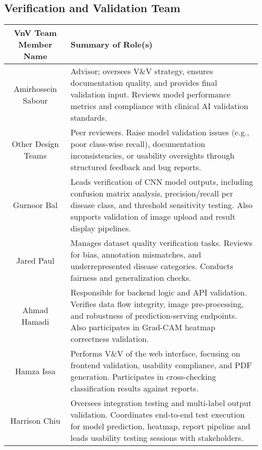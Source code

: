 \documentclass[12pt, titlepage]{article}
\begin{document}
\subsection{Verification and Validation Team}


\begin{table}[h]
  \centering
  \begin{tabular}{|c|p{}|}
    \hline
    \textbf{VnV Team Member Name} & \textbf{Summary of Role(s)} \\ \hline

    Amirhossein Sabour & 
    Advisor; oversees V\&V strategy, ensures documentation quality, and provides final validation input. Reviews model performance metrics and compliance with clinical AI validation standards. \\ \hline

    Other Design Teams & 
    Peer reviewers. Raise model validation issues (e.g., poor class-wise recall), documentation inconsistencies, or usability oversights through structured feedback and bug reports. \\ \hline

    Gurnoor Bal & 
    Leads verification of CNN model outputs, including confusion matrix analysis, precision/recall per disease class, and threshold sensitivity testing. Also supports validation of image upload and result display pipelines. \\ \hline

    Jared Paul & 
    Manages dataset quality verification tasks. Reviews for bias, annotation mismatches, and underrepresented disease categories. Conducts fairness and generalization checks. \\ \hline

    Ahmad Hamadi & 
    Responsible for backend logic and API validation. Verifies data flow integrity, image pre-processing, and robustness of prediction-serving endpoints. Also participates in Grad-CAM heatmap correctness validation. \\ \hline

    Hamza Issa & 
    Performs V\&V of the web interface, focusing on frontend validation, usability compliance, and PDF generation. Participates in cross-checking classification results against reports. \\ \hline

    Harrison Chiu & 
    Oversees integration testing and multi-label output validation. Coordinates end-to-end test execution for model prediction, heatmap, report pipeline and leads usability testing sessions with stakeholders. \\ \hline
  \end{tabular}
\end{table}
\end{document}
